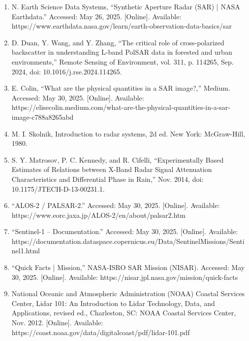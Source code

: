 \documentclass{article}
\begin{document}
\begin{enumerate}
    \item{N. Earth Science Data Systems, “Synthetic Aperture Radar (SAR) | NASA Earthdata.” Accessed: May 26, 2025. [Online]. Available: https://www.earthdata.nasa.gov/learn/earth-observation-data-basics/sar}


    \item{D. Duan, Y. Wang, and Y. Zhang, “The critical role of cross-polarized backscatter in understanding L-band PolSAR data in forested and urban environments,” Remote Sensing of Environment, vol. 311, p. 114265, Sep. 2024, doi: 10.1016/j.rse.2024.114265.}

    \item{E. Colin, “What are the physical quantities in a SAR image?,” Medium. Accessed: May 30, 2025. [Online]. Available: https://elisecolin.medium.com/what-are-the-physical-quantities-in-a-sar-image-c788a8265abd}


    \item{M. I. Skolnik, Introduction to radar systems, 2d ed. New York: McGraw-Hill, 1980.}

    \item{S. Y. Matrosov, P. C. Kennedy, and R. Cifelli, “Experimentally Based Estimates of Relations between X-Band Radar Signal Attenuation Characteristics and Differential Phase in Rain,” Nov. 2014, doi: 10.1175/JTECH-D-13-00231.1.}

    \item{“ALOS-2 / PALSAR-2.” Accessed: May 30, 2025. [Online]. Available: https://www.eorc.jaxa.jp/ALOS-2/en/about/palsar2.htm}


    \item{“Sentinel-1 – Documentation.” Accessed: May 30, 2025. [Online]. Available: https://documentation.dataspace.copernicus.eu/Data/SentinelMissions/Sentinel1.html}


    \item{“Quick Facts | Mission,” NASA-ISRO SAR Mission (NISAR). Accessed: May 30, 2025. [Online]. Available: https://nisar.jpl.nasa.gov/mission/quick-facts}


    \item {National Oceanic and Atmospheric Administration (NOAA) Coastal Services Center, Lidar 101: An Introduction to Lidar Technology, Data, and Applications, revised ed., Charleston, SC: NOAA Coastal Services Center, Nov. 2012. [Online]. Available: https://coast.noaa.gov/data/digitalcoast/pdf/lidar-101.pdf}


\end{enumerate}
\end{document}
